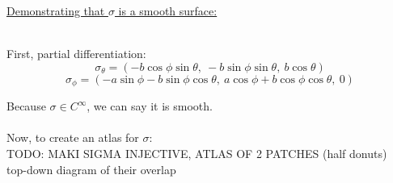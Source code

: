 \documentclass[12pt]{article}
\newcommand{\ulind}[1]
{
\noindent
\underline{#1}\\\\
\indent
}
\begin{document}
\clearpage

\ulind{Demonstrating that $\sigma$ is a smooth surface:}
First, partial differentiation:
$$
\sigma_\theta = (-b \cos \phi \sin \theta, \ -b \sin \phi \sin \theta, \ b \cos \theta )
$$
$$
\sigma_\phi = (-a \sin \phi - b \sin \phi \cos \theta, \ a \cos \phi + b \cos \phi \cos \theta, \ 0 )
$$

Because $\sigma \in C^\infty$, we can say it is smooth.\\\\
Now, to create an atlas for $\sigma$:\\

TODO:
MAKI SIGMA INJECTIVE, ATLAS OF 2 PATCHES (half donuts)\\
top-down diagram of their overlap
\end{document}
